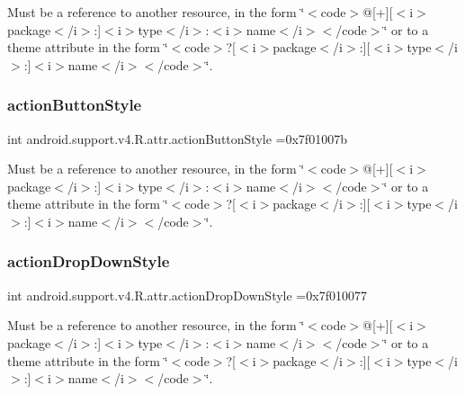 Must be a reference to another resource, in the form \char`\"{}$<$code$>$@\mbox{[}+\mbox{]}\mbox{[}$<$i$>$package$<$/i$>$\+:\mbox{]}$<$i$>$type$<$/i$>$\+:$<$i$>$name$<$/i$>$$<$/code$>$\char`\"{} or to a theme attribute in the form \char`\"{}$<$code$>$?\mbox{[}$<$i$>$package$<$/i$>$\+:\mbox{]}\mbox{[}$<$i$>$type$<$/i$>$\+:\mbox{]}$<$i$>$name$<$/i$>$$<$/code$>$\char`\"{}. \mbox{\label{classandroid_1_1support_1_1v4_1_1R_1_1attr_a949bd6a877fac5b545925783cb5acff2}} 
\subsubsection{\texorpdfstring{action\+Button\+Style}{actionButtonStyle}}
{\footnotesize\ttfamily int android.\+support.\+v4.\+R.\+attr.\+action\+Button\+Style =0x7f01007b\hspace{0.3cm}{\ttfamily [static]}}

Must be a reference to another resource, in the form \char`\"{}$<$code$>$@\mbox{[}+\mbox{]}\mbox{[}$<$i$>$package$<$/i$>$\+:\mbox{]}$<$i$>$type$<$/i$>$\+:$<$i$>$name$<$/i$>$$<$/code$>$\char`\"{} or to a theme attribute in the form \char`\"{}$<$code$>$?\mbox{[}$<$i$>$package$<$/i$>$\+:\mbox{]}\mbox{[}$<$i$>$type$<$/i$>$\+:\mbox{]}$<$i$>$name$<$/i$>$$<$/code$>$\char`\"{}. \mbox{\label{classandroid_1_1support_1_1v4_1_1R_1_1attr_ae799f8ef42f49ca4ab5fde37b9c1d639}} 
\subsubsection{\texorpdfstring{action\+Drop\+Down\+Style}{actionDropDownStyle}}
{\footnotesize\ttfamily int android.\+support.\+v4.\+R.\+attr.\+action\+Drop\+Down\+Style =0x7f010077\hspace{0.3cm}{\ttfamily [static]}}

Must be a reference to another resource, in the form \char`\"{}$<$code$>$@\mbox{[}+\mbox{]}\mbox{[}$<$i$>$package$<$/i$>$\+:\mbox{]}$<$i$>$type$<$/i$>$\+:$<$i$>$name$<$/i$>$$<$/code$>$\char`\"{} or to a theme attribute in the form \char`\"{}$<$code$>$?\mbox{[}$<$i$>$package$<$/i$>$\+:\mbox{]}\mbox{[}$<$i$>$type$<$/i$>$\+:\mbox{]}$<$i$>$name$<$/i$>$$<$/code$>$\char`\"{}. \mbox{\label{classandroid_1_1support_1_1v4_1_1R_1_1attr_aaa9aa593650ce0ecbacb2754922c8a77}} 
